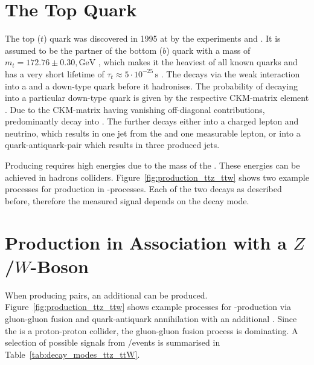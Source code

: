 \documentclass[bachelor,oneside, BCOR10mm,
			ngerman,english  %
]{GAUBM}
\begin{document}
\section{The Top Quark}
The top ($t$) quark was discovered in 1995 at \fermilab by the experiments \cdf\cite{top_production01} and \dzero \cite{top_production02}. It is assumed to be the partner of the bottom ($b$) quark with a mass of $m_t=172.76\pm0.30,\text{GeV}$ \cite{top_mass}, which makes it the heaviest of all known quarks and has a very short lifetime of $\tau_t\approx5\cdot10^{-25}\,\text{s}$ \cite{top_mass}. The \tquark decays via the weak interaction into a \wboson and a down-type quark before it hadronises. The probability of decaying into a particular down-type quark is given by the respective CKM-matrix element \cite{ckm_matrix}. Due to the CKM-matrix having vanishing off-diagonal contributions, \tquarks predominantly decay into \bquarks. The \wboson further decays either into a charged lepton and neutrino, which results in one jet from the \bquark and one measurable lepton, or into a quark-antiquark-pair which results in three produced jets.
%

Producing \tquarks requires high energies due to the mass of the \tquark. These energies can be achieved in hadrons colliders. Figure~\ref{fig:production_ttz_ttw} shows two example processes for \tquark production in \ttbar-processes. Each of the two \tquarks decays as described before, therefore the measured signal depends on the \wboson decay mode.

\section{\ttbar{} Production in Association with a $Z$/$W$-Boson}
\label{sec:theory_ttZ_ttW}
When producing \ttbar pairs, an additional \zwboson can be produced. Figure~\ref{fig:production_ttz_ttw} shows example processes for \ttbar-production via gluon-gluon fusion and quark-antiquark annihilation with an additional \zwboson. Since the \lhc is a proton-proton collider, the gluon-gluon fusion process is dominating. A selection of possible signals from \ttbarZ/\ttbarW events is summarised in Table~\ref{tab:decay_modes_ttz_ttW}.
\end{document}
